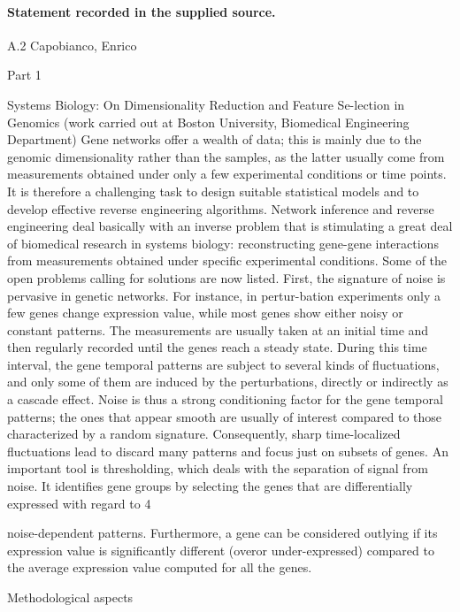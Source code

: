 \documentclass[11pt]{article}
\begin{document}
\paragraph{Statement recorded in the supplied source.}
A.2 Capobianco, Enrico

Part 1

Systems Biology: On Dimensionality Reduction and Feature Se-lection in Genomics (work carried out at Boston University, Biomedical Engineering Department) Gene networks offer a wealth of data; this is mainly due to the genomic dimensionality rather than the samples, as the latter usually come from measurements obtained under only a few experimental conditions or time points. It is therefore a challenging task to design suitable statistical models and to develop effective reverse engineering algorithms. Network inference and reverse engineering deal basically with an inverse problem that is stimulating a great deal of biomedical research in systems biology: reconstructing gene-gene interactions from measurements obtained under specific experimental conditions. Some of the open problems calling for solutions are now listed. First, the signature of noise is pervasive in genetic networks. For instance, in pertur-bation experiments only a few genes change expression value, while most genes show either noisy or constant patterns. The measurements are usually taken at an initial time and then regularly recorded until the genes reach a steady state. During this time interval, the gene temporal patterns are subject to several kinds of fluctuations, and only some of them are induced by the perturbations, directly or indirectly as a cascade effect. Noise is thus a strong conditioning factor for the gene temporal patterns; the ones that appear smooth are usually of interest compared to those characterized by a random signature. Consequently, sharp time-localized fluctuations lead to discard many patterns and focus just on subsets of genes. An important tool is thresholding, which deals with the separation of signal from noise. It identifies gene groups by selecting the genes that are differentially expressed with regard to 4

noise-dependent patterns. Furthermore, a gene can be considered outlying if its expression value is significantly different (overor under-expressed) compared to the average expression value computed for all the genes.

Methodological aspects
\end{document}
